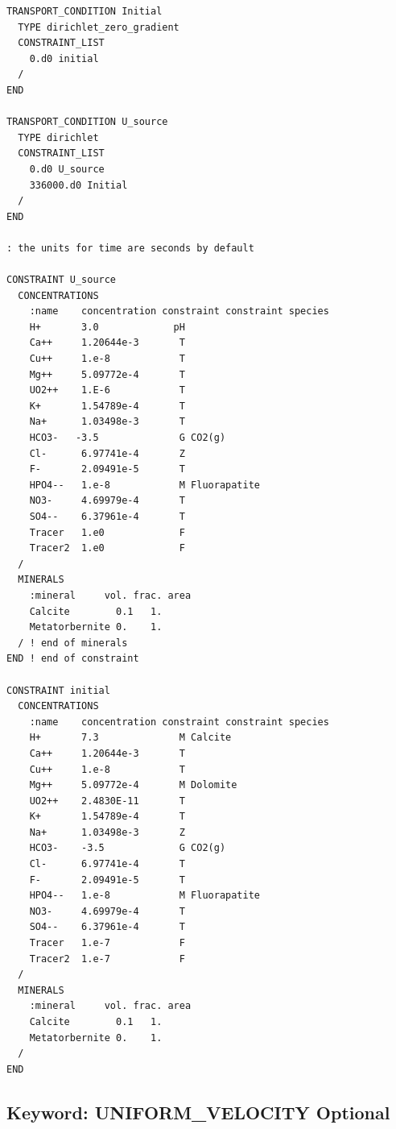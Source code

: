 \documentclass[12pt]{article}
\begin{document}
\begin{mdframed}


\begin{verbatim}
TRANSPORT_CONDITION Initial
  TYPE dirichlet_zero_gradient
  CONSTRAINT_LIST
    0.d0 initial
  /
END

TRANSPORT_CONDITION U_source
  TYPE dirichlet
  CONSTRAINT_LIST
    0.d0 U_source
    336000.d0 Initial
  /
END

: the units for time are seconds by default

CONSTRAINT U_source
  CONCENTRATIONS
    :name    concentration constraint constraint species
    H+       3.0             pH
    Ca++     1.20644e-3       T
    Cu++     1.e-8            T
    Mg++     5.09772e-4       T
    UO2++    1.E-6            T
    K+       1.54789e-4       T
    Na+      1.03498e-3       T
    HCO3-   -3.5              G CO2(g)
    Cl-      6.97741e-4       Z
    F-       2.09491e-5       T
    HPO4--   1.e-8            M Fluorapatite
    NO3-     4.69979e-4       T
    SO4--    6.37961e-4       T
    Tracer   1.e0             F
    Tracer2  1.e0             F
  /
  MINERALS
    :mineral     vol. frac. area
    Calcite        0.1   1.
    Metatorbernite 0.    1.
  / ! end of minerals
END ! end of constraint

CONSTRAINT initial
  CONCENTRATIONS
    :name    concentration constraint constraint species
    H+       7.3              M Calcite
    Ca++     1.20644e-3       T
    Cu++     1.e-8            T
    Mg++     5.09772e-4       M Dolomite
    UO2++    2.4830E-11       T
    K+       1.54789e-4       T
    Na+      1.03498e-3       Z
    HCO3-    -3.5             G CO2(g)
    Cl-      6.97741e-4       T
    F-       2.09491e-5       T
    HPO4--   1.e-8            M Fluorapatite
    NO3-     4.69979e-4       T
    SO4--    6.37961e-4       T
    Tracer   1.e-7            F
    Tracer2  1.e-7            F
  /
  MINERALS
    :mineral     vol. frac. area
    Calcite        0.1   1.
    Metatorbernite 0.    1.
  /
END
\end{verbatim}

\end{mdframed}

\hyperlink{target_key}{\return}


\newpage
\protect\hypertarget{target_unifvel}{}

\subsection{Keyword: UNIFORM\_VELOCITY \hfill Optional}
\end{document}
